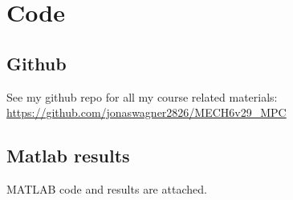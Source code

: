 \documentclass[]{article}
\begin{document}


\newpage
\appendix
\section{Code}
\subsection{Github}
See my github repo for all my course related materials: 
\url{https://github.com/jonaswagner2826/MECH6v29_MPC}

\subsection{Matlab results}
MATLAB code and results are attached.
% 
% 
% 
\end{document}
